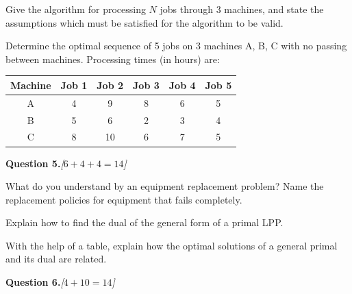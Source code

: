 \documentclass[11pt,a4paper]{article}
\newcommand{\pts}[1]{\hfill   \textit{[#1]}}
\begin{document}
\begin{parts}
  \item Give the algorithm for processing $N$ jobs through 3 machines, and state the assumptions which must be satisfied for the algorithm to be valid.
  \item Determine the optimal sequence of 5 jobs on 3 machines A, B, C with no passing between machines. Processing times (in hours) are:
  
\begin{center}
  
\begin{tabular}{|c|c|c|c|c|c|}
  \hline
   \textbf{Machine} &   \textbf{Job 1} &   \textbf{Job 2} &   \textbf{Job 3} &   \textbf{Job 4} &   \textbf{Job 5} \\
  \hline
  A & 4 & 9 & 8 & 6 & 5 \\
  B & 5 & 6 & 2 & 3 & 4 \\
  C & 8 & 10 & 6 & 7 & 5 \\
  \hline
  \end{tabular}
  \end{center}
\end{parts}

\bigskip




\noindent   \textbf{Question 5.}\pts{$6+4+4=14$}

\begin{parts}
  \item What do you understand by an equipment replacement problem? Name the replacement policies for equipment that fails completely.
  \item Explain how to find the dual of the general form of a primal LPP.
  \item With the help of a table, explain how the optimal solutions of a general primal and its dual are related.
\end{parts}

\bigskip




\noindent   \textbf{Question 6.}\pts{$4+10=14$}
\end{document}
